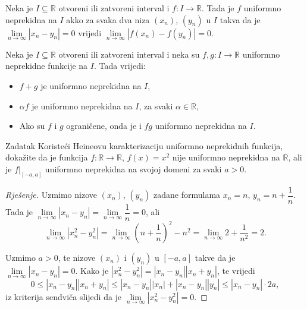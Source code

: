 \begin{remark}
Neka je \(I\subseteq \mathbb{R}\) otvoreni ili zatvoreni interval i \(f : I\to \mathbb{R}\). Tada je \(f\) uniformno neprekidna na \(I\) akko za svaka dva niza \((x_n)\), \((y_n)\) u \(I\) takva da je \(\lim\limits_{n\to \infty}{|x_n-y_n|}=0\) vrijedi \(\lim\limits_{n\to \infty}{\left\lvert f(x_n)-f(y_n)\right\rvert}=0\).
\end{remark}
\begin{remark}
Neka je \(I\subseteq \mathbb{R}\) otvoreni ili zatvoreni interval i neka su \(f, g : I\to \mathbb{R}\) uniformno neprekidne funkcije na \(I\). Tada vrijedi:
\begin{itemize}
\item[a)] \(f+g\) je uniformno neprekidna na \(I\),
\item[b)] \(\alpha f\) je uniformno neprekidna na \(I\), za svaki \(\alpha\in \mathbb{R}\),
\item[c)] Ako su \(f\) i \(g\) ograničene, onda je i \(fg\) uniformno neprekidna na \(I\). 
\end{itemize}
\end{remark}
\begin{exercise}{Zadatak}
Koristeći Heineovu karakterizaciju uniformno neprekidnih funkcija, dokažite da je funkcija \(f : \mathbb{R}\to \mathbb{R}\), \(f(x)=x^2\) nije uniformno neprekidna na \(\mathbb{R}\), ali je \(f|_{[-a, a]}\) uniformno neprekidna na svojoj domeni za svaki \(a>0\).
\end{exercise}
\begin{proof}[Rješenje]
Uzmimo nizove \((x_n)\), \((y_n)\) zadane formulama \(x_n=n\), \(y_n=n+\dfrac{1}{n}\). Tada je \(\lim\limits_{n\to \infty}{|x_n-y_n|}=\lim\limits_{n\to \infty}{\dfrac{1}{n}}=0\), ali
\[\lim\limits_{n\to \infty}{\left\lvert x_n^2-y_n^2\right\rvert}=\lim\limits_{n\to \infty}{\left(n+\dfrac{1}{n}\right)^2-n^2}=\lim\limits_{n\to \infty}{2+\dfrac{1}{n^2}}=2.\]

Uzmimo \(a>0\), te nizove \((x_n)\) i \((y_n)\) u \([-a, a]\) takve da je \(\lim\limits_{n\to \infty}{|x_n-y_n|}=0\). Kako je \(\left\lvert x_n^2-y_n^2\right\rvert=\left\lvert x_n-y_n\right\rvert\left\lvert x_n+y_n\right\rvert\), te vrijedi
\[0\leq \left\lvert x_n-y_n\right\rvert\left\lvert x_n+y_n\right\rvert\leq \left\lvert x_n-y_n\right\rvert\left\lvert x_n\right\rvert+\left\lvert x_n-y_n\right\rvert\left\lvert y_n\right\rvert\leq \left\lvert x_n-y_n\right\rvert\cdot 2a,\]
iz kriterija sendviča slijedi da je \(\lim\limits_{n\to \infty}{\left\lvert x_n^2-y_n^2\right\rvert}=0\).
\end{proof}
